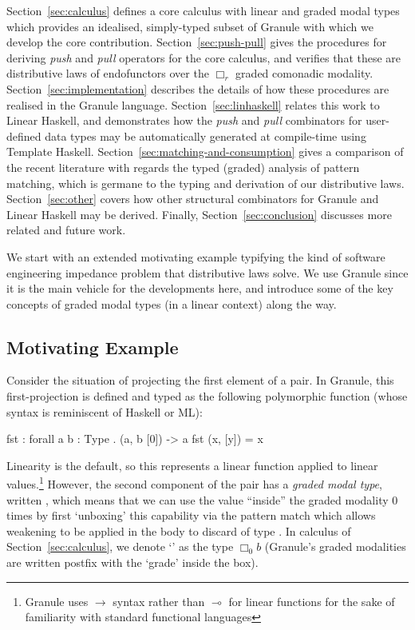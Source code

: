Section~\ref{sec:calculus} defines a core calculus \grminip{} with
linear and graded modal types which provides an idealised,
simply-typed subset of Granule with which we develop the core
contribution.  Section~\ref{sec:push-pull} gives the
procedures for deriving \emph{push} and \emph{pull} operators for the core calculus,
and verifies that these are distributive laws of endofunctors over the
$\Box_r$ graded comonadic modality.
Section~\ref{sec:implementation} describes the details of how these
procedures are realised in the Granule language.
Section~\ref{sec:linhaskell} relates this work to Linear Haskell, and
demonstrates how the \emph{push} and \emph{pull} combinators for user-defined data types
may be automatically generated at compile-time using Template Haskell.
Section~\ref{sec:matching-and-consumption} gives a comparison of the
recent literature with regards the typed (graded) analysis of pattern
matching, which is germane to the typing and derivation of our
distributive laws.
Section~\ref{sec:other} covers how other structural combinators for
Granule and Linear Haskell may be derived. Finally,
Section~\ref{sec:conclusion} discusses more related and future work.

We start with an extended motivating example typifying the kind
of software engineering impedance problem that distributive laws
solve. We use Granule since it is the main vehicle for the developments
here, and introduce some of the key concepts of graded modal types (in
a linear context) along the way.

\subsection{Motivating Example}
\label{sec:motivating-example}

Consider the situation of projecting the first element of a pair. In Granule,
this first-projection is defined and typed as the following
polymorphic function (whose syntax is reminiscent of Haskell or ML):
%
\begin{granule}
fst : forall {a b : Type} . (a, b [0]) -> a
fst (x, [y]) = x
\end{granule}
%
Linearity is the default, so this represents a linear function applied
to linear values.\footnote{Granule uses $\rightarrow$ syntax rather than
$\multimap$ for linear functions for the sake of familiarity with
standard functional languages} However, the second component of the pair
has a \emph{graded modal type}, written , which means that we can use
the value ``inside'' the graded modality $0$ times by first `unboxing'
this capability via the pattern match \granin{[y]} which allows
weakening to be applied in the body to discard  of type .
In calculus of Section~\ref{sec:calculus}, we denote
`' as the type $\Box_0 b$ (Granule's graded
modalities are written postfix with the `grade' inside the box).

